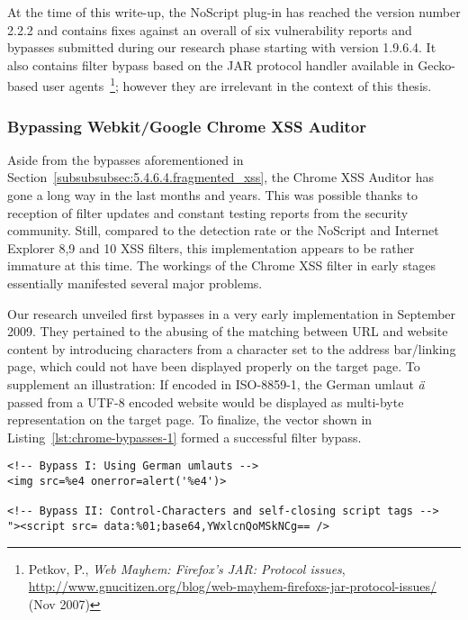       At the time of this write-up, the NoScript plug-in has reached the version number 2.2.2 and contains fixes against an overall of six vulnerability reports and bypasses submitted during our research phase starting with version 1.9.6.4. It also contains filter bypass based on the JAR protocol handler available in Gecko-based user agents~\footnote{Petkov, P., \textit{Web Mayhem: Firefox’s JAR: Protocol issues}, \url{http://www.gnucitizen.org/blog/web-mayhem-firefoxs-jar-protocol-issues/} (Nov 2007)}; however they are irrelevant in the context of this thesis.

      \subsubsection{Bypassing Webkit/Google Chrome XSS Auditor}
      \label{5.4.7.2.bypassing_chrome_xss_auditor}

      Aside from the bypasses aforementioned in Section~\ref{subsubsubsec:5.4.6.4.fragmented_xss}, the Chrome XSS Auditor has gone a long way in the last months and years. This was possible thanks to reception of filter updates and constant testing reports from the security community. Still, compared to the detection rate or the NoScript and Internet Explorer 8,9 and 10 XSS filters, this implementation appears to be rather immature at this time. The workings of the Chrome XSS filter in early stages essentially manifested several major problems. 

      Our research unveiled first bypasses in a very early implementation in September 2009. They pertained to the abusing of the matching between URL and website content by introducing characters from a character set to the address bar/linking page, which could not have been displayed properly on the target page. To supplement an illustration: If encoded in ISO-8859-1, the German umlaut \textit{ä} passed from a UTF-8 encoded website would be displayed as multi-byte representation on the target page. To finalize, the vector shown in Listing~\ref{lst:chrome-bypasses-1} formed a successful filter bypass. 

\begin{lstlisting}[label=lst:chrome-bypasses-1,caption=Example bypasses for the Chrome XSS Auditor; both are using encoding tricks to bypass the filter rules,captionpos=b]
<!-- Bypass I: Using German umlauts -->
<img src=%e4 onerror=alert('%e4')>

<!-- Bypass II: Control-Characters and self-closing script tags -->
"><script src= data:%01;base64,YWxlcnQoMSkNCg== />
\end{lstlisting}


